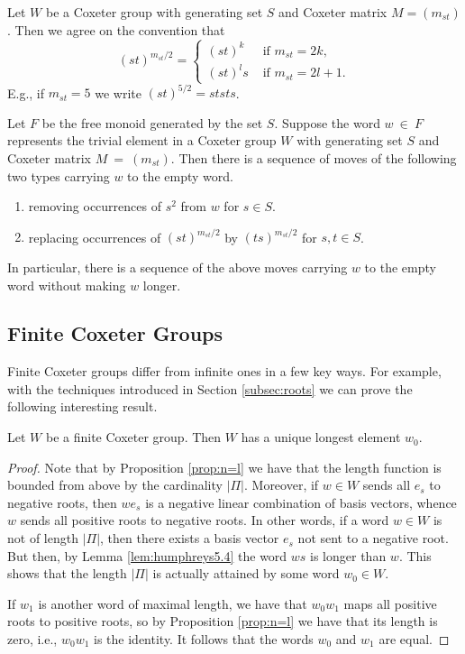 \documentclass[main.tex]{subfiles}
\begin{document}
\begin{notation}
Let $W$ be a Coxeter group with generating set $S$ and Coxeter matrix $M = (m_{st})$. Then we agree on the convention that
$$(st)^{m_{st}/2} =  \begin{cases}
(st)^k & \text{ if } m_{st} = 2k, \\
(st)^ls & \text{ if } m_{st} = 2l + 1.
\end{cases}$$
E.g., if $m_{st}=5$ we write $(st)^{5/2} = ststs$. 
\end{notation}

\begin{theorem}[Tits]\label{thm:word-problem}
Let $F$ be the free monoid generated by the set $S$. Suppose the word $w~\in~F$ represents the trivial element in a Coxeter group $W$ with generating set $S$ and Coxeter matrix $M~=~(m_{st})$. Then there is a sequence of moves of the following two types carrying $w$ to the empty word.

\begin{enumerate}
\setlength\itemsep{0em}
\item removing occurrences of $s^2$ from $w$ for $s \in S$.
\item replacing occurrences of $(st)^{m_{st}/2}$ by $(ts)^{m_{st}/2}$ for $s, t \in S$.
\end{enumerate}
In particular, there is a sequence of the above moves carrying $w$ to the empty word without making $w$ longer.
\end{theorem}

\subsection{Finite Coxeter Groups}
Finite Coxeter groups differ from infinite ones in a few key ways. For example, with the techniques introduced in Section \ref{subsec:roots} we can prove the following interesting result.

\begin{theorem}
Let $W$ be a finite Coxeter group. Then $W$ has a unique longest element $w_0$.
\end{theorem}

\begin{proof}
Note that by Proposition \ref{prop:n=l} we have that the length function is bounded from above by the cardinality $|\Pi|$. Moreover, if $w \in W$ sends all $e_s$ to negative roots, then $we_s$ is a negative linear combination of basis vectors, whence $w$ sends all positive roots to negative roots. In other words, if a word $w \in W$ is not of length $|\Pi|$, then there exists a basis vector $e_s$ not sent to a negative root. But then, by Lemma \ref{lem:humphreys5.4} the word $ws$ is longer than $w$. This shows that the length $|\Pi|$ is actually attained by some word $w_0 \in W$.

If $w_1$ is another word of maximal length, we have that $w_0w_1$ maps all positive roots to positive roots, so by Proposition \ref{prop:n=l} we have that its length is zero, i.e., $w_0w_1$ is the identity. It follows that the words $w_0$ and $w_1$ are equal.
\end{proof}
\end{document}
